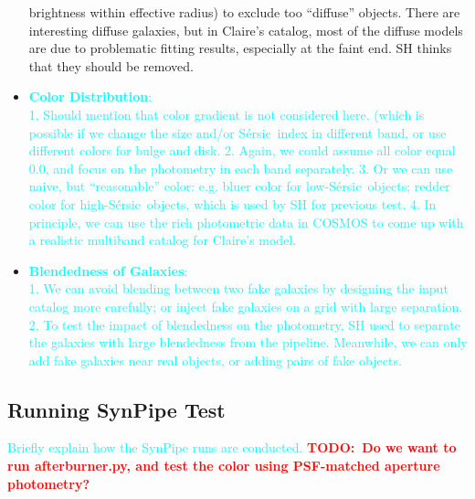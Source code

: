 \documentclass[preprint]{aastex}
\def\ser{{S\'{e}rsic\ }}
\newcommand{\todo}[1]{\textcolor{red}{\textbf{TODO:~#1}}}
\newcommand{\plan}[1]{\textcolor{cyan}{#1}}
\begin{document}
\begin{itemize}
{                       brightness within effective radius) to exclude too ``diffuse'' objects.  
                       There are interesting diffuse galaxies, but in Claire's catalog, most 
                       of the diffuse models are due to problematic fitting results, especially 
                       at the faint end.  SH thinks that they should be removed.}
        \item \plan{\textbf{Color Distribution}: \\
                    1. Should mention that color gradient is not considered here.  
                       (which is possible if we change the size and/or \ser index in different 
                       band, or use different colors for bulge and disk.
                    2. Again, we could assume all color equal 0.0, and focus on the photometry 
                       in each band separately. 
                    3. Or we can use naive, but ``reasonable'' color: e.g. bluer color for 
                       low-\ser objects; redder color for high-\ser objects, which is used by SH
                       for previous test.
                    4. In principle, we can use the rich photometric data in COSMOS to come 
                       up with a realistic multiband catalog for Claire's model.}
       \item \plan{\textbf{Blendedness of Galaxies}: \\ 
                   1. We can avoid blending between two fake galaxies by designing the input 
                      catalog more carefully; or inject fake galaxies on a grid with large 
                      separation.
                   2. To test the impact of blendedness on the photometry, SH used to separate 
                      the galaxies with large blendedness from the pipeline. Meanwhile, we 
                      can only add fake galaxies near real objects, or adding pairs of fake 
                      objects.}
    \end{itemize}


\subsection{Running SynPipe Test}

    \plan{Briefly explain how the SynPipe runs are conducted.}
    \todo{Do we want to run afterburner.py, and test the color using PSF-matched 
          aperture photometry?}
          
\end{document}
